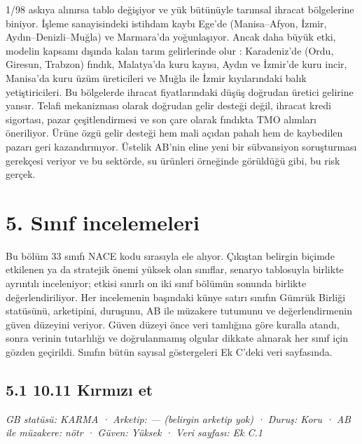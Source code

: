 1/98 askıya alınırsa tablo değişiyor ve yük bütünüyle tarımsal ihracat bölgelerine biniyor. İşleme sanayisindeki istihdam kaybı Ege'de (Manisa--Afyon, İzmir, Aydın--Denizli--Muğla) ve Marmara'da yoğunlaşıyor. Ancak daha büyük etki, modelin kapsamı dışında kalan tarım gelirlerinde olur \etiketH{}: Karadeniz'de (Ordu, Giresun, Trabzon) fındık, Malatya'da kuru kayısı, Aydın ve İzmir'de kuru incir, Manisa'da kuru üzüm üreticileri ve Muğla ile İzmir kıyılarındaki balık yetiştiricileri. Bu bölgelerde ihracat fiyatlarındaki düşüş doğrudan üretici gelirine yansır. Telafi mekanizması olarak doğrudan gelir desteği değil, ihracat kredi sigortası, pazar çeşitlendirmesi ve son çare olarak fındıkta TMO alımları öneriliyor. Ürüne özgü gelir desteği hem mali açıdan pahalı hem de kaybedilen pazarı geri kazandırmıyor. Üstelik AB'nin eline yeni bir sübvansiyon soruşturması gerekçesi veriyor ve bu sektörde, su ürünleri örneğinde görüldüğü gibi, bu risk gerçek.

\hypertarget{nace_kartlar_10-12-5-sux131nux131f-incelemeleri}{%
\section{5. Sınıf incelemeleri}\label{nace_kartlar_10-12-5-sux131nux131f-incelemeleri}}

Bu bölüm 33 sınıfı NACE kodu sırasıyla ele alıyor. Çıkıştan belirgin biçimde etkilenen ya da stratejik önemi yüksek olan sınıflar, senaryo tablosuyla birlikte ayrıntılı inceleniyor; etkisi sınırlı on iki sınıf bölümün sonunda birlikte değerlendiriliyor. Her incelemenin başındaki künye satırı sınıfın Gümrük Birliği statüsünü, arketipini, duruşunu, AB ile müzakere tutumunu ve değerlendirmenin güven düzeyini veriyor. Güven düzeyi önce veri tamlığına göre kuralla atandı, sonra verinin tutarlılığı ve doğrulanmamış olgular dikkate alınarak her sınıf için gözden geçirildi. Sınıfın bütün sayısal göstergeleri Ek C'deki veri sayfasında.

\hypertarget{nace_kartlar_10-12-51-1011-kux131rmux131zux131-et}{%
\subsection{5.1 10.11 Kırmızı et}\label{nace_kartlar_10-12-51-1011-kux131rmux131zux131-et}}

\emph{GB statüsü: KARMA · Arketip: --- (belirgin arketip yok) · Duruş: Koru · AB ile müzakere: nötr · Güven: Yüksek · Veri sayfası: Ek C.1}

